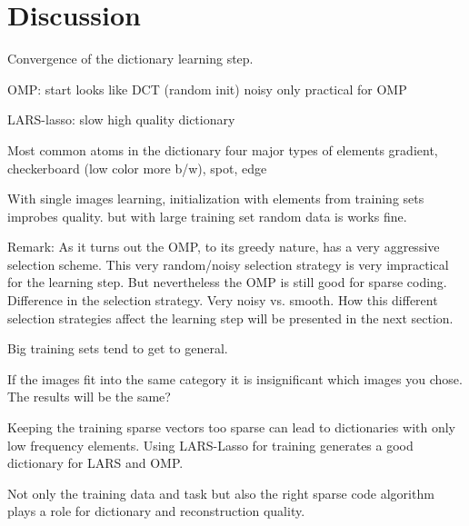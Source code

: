 \chapter{Discussion}



Convergence of the dictionary learning step.

OMP:
  start looks like DCT (random init)
  noisy
  only practical for OMP

LARS-lasso:
  slow 
  high quality dictionary

  Most common atoms in the dictionary 
  four major types of elements
  gradient, checkerboard (low color more b/w), spot, edge



With single images learning, initialization with elements from training sets
improbes quality. but with large training set random data is works fine.


Remark:
As it turns out the OMP, to its greedy nature, has a very aggressive selection
scheme. This very random/noisy selection strategy is very impractical
for the \trainDL learning step. But nevertheless the OMP is still good for
sparse coding. 
Difference in the selection strategy.
Very noisy vs. smooth. 
How this different selection strategies affect the learning step will be
presented in the next section.

Big training sets tend to get to general.

If the images fit into the same category it is insignificant which images you
chose. The results will be the same?

Keeping the training sparse vectors too sparse can lead to dictionaries with
only low frequency elements. Using LARS-Lasso for training generates a good
dictionary for LARS and OMP. 




Not only the training data and task but also the right
sparse code algorithm plays a role for dictionary and reconstruction quality.

